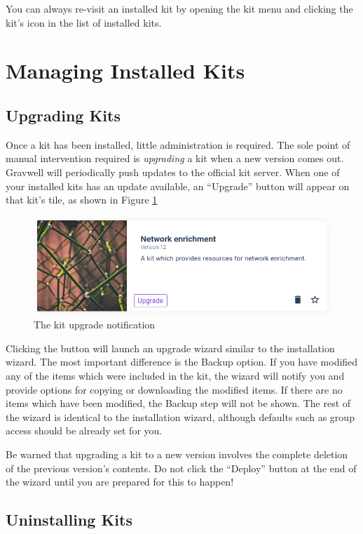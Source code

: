 You can always re-visit an installed kit by opening the kit menu and clicking the kit's icon in the list of installed kits.

\section{Managing Installed Kits}

\subsection{Upgrading Kits}

Once a kit has been installed, little administration is required. The sole point of manual intervention required is \emph{upgrading} a kit when a new version comes out. Gravwell will periodically push updates to the official kit server. When one of your installed kits has an update available, an ``Upgrade'' button will appear on that kit's tile, as shown in Figure \ref{fig:upgradekit}

\begin{figure}[H]
	\includegraphics[width=0.4\linewidth]{images/upgradekit.png}
	\caption{The kit upgrade notification}
	\label{fig:upgradekit}
\end{figure}

Clicking the button will launch an upgrade wizard similar to the installation wizard. The most important difference is the Backup option. If you have modified any of the items which were included in the kit, the wizard will notify you and provide options for copying or downloading the modified items. If there are no items which have been modified, the Backup step will not be shown. The rest of the wizard is identical to the installation wizard, although defaults such as group access should be already set for you.

Be warned that upgrading a kit to a new version involves the complete deletion of the previous version's contents. Do not click the ``Deploy'' button at the end of the wizard until you are prepared for this to happen!

\subsection{Uninstalling Kits}

